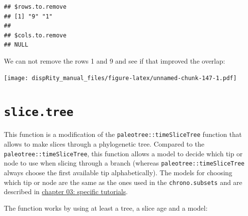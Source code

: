 \documentclass[]{book}
\newenvironment{Shaded}{\begin{snugshade}}{\end{snugshade}}
\newcommand{\DataTypeTok}[1]{\textcolor[rgb]{0.13,0.29,0.53}{#1}}
\newcommand{\KeywordTok}[1]{\textcolor[rgb]{0.13,0.29,0.53}{\textbf{#1}}}
\newcommand{\NormalTok}[1]{#1}
\newcommand{\OperatorTok}[1]{\textcolor[rgb]{0.81,0.36,0.00}{\textbf{#1}}}
\newcommand{\StringTok}[1]{\textcolor[rgb]{0.31,0.60,0.02}{#1}}
\begin{document}
\begin{verbatim}
## $rows.to.remove
## [1] "9" "1"
## 
## $cols.to.remove
## NULL
\end{verbatim}

We can not remove the rows 1 and 9 and see if that improved the overlap:

\begin{Shaded}
\end{Shaded}

\texttt{[image: dispRity\_manual\_files/figure-latex/unnamed-chunk-147-1.pdf]}

\hypertarget{slice.tree}{%
\section{\texorpdfstring{\texttt{slice.tree}}{slice.tree}}\label{slice.tree}}

This function is a modification of the \texttt{paleotree::timeSliceTree} function that allows to make slices through a phylogenetic tree.
Compared to the \texttt{paleotree::timeSliceTree}, this function allows a model to decide which tip or node to use when slicing through a branch (whereas \texttt{paleotree::timeSliceTree} always choose the first available tip alphabetically).
The models for choosing which tip or node are the same as the ones used in the \texttt{chrono.subsets} and are described in \protect\hyperlink{chrono-subsets}{chapter 03: specific tutorials}.

The function works by using at least a tree, a slice age and a model:
\end{document}
